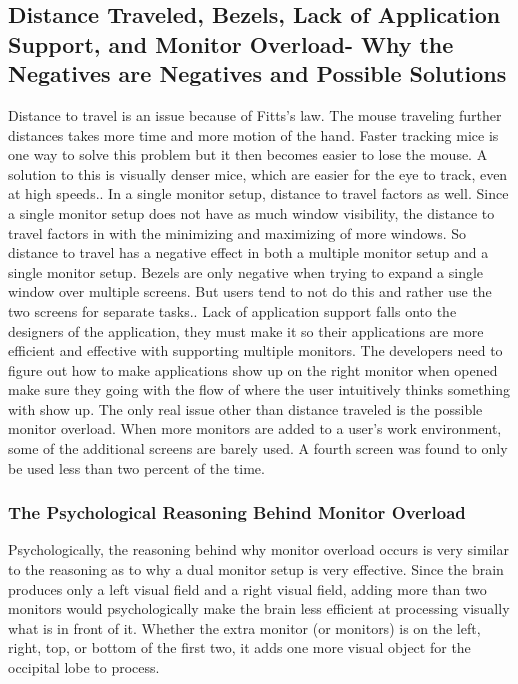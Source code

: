 \documentclass[a4paper]{article}
\begin{document}
\subsection{Distance Traveled, Bezels, Lack of Application Support, and Monitor Overload- Why the Negatives are Negatives and Possible Solutions}
Distance to travel is an issue because of Fitts's law. The mouse traveling further distances takes more time and more motion of the hand. Faster tracking mice is one way to solve this problem but it then becomes easier to lose the mouse. A solution to this is visually denser mice, which are easier for the eye to track, even at high speeds.\cite{Truemper}. In a single monitor setup, distance to travel factors as well. Since a single monitor setup does not have as much window visibility, the distance to travel factors in with the minimizing and maximizing of more windows. So distance to travel has a negative effect in both a multiple monitor setup and a single monitor setup. Bezels are only negative when trying to expand a single window over multiple screens. But users tend to not do this and rather use the two screens for separate tasks.\cite{Grudin}. Lack of application support falls onto the designers of the application, they must make it so their applications are more efficient and effective with supporting multiple monitors. The developers need to figure out how to make applications show up on the right monitor when opened make sure they going with the flow of where the user intuitively thinks something with show up.\cite{Grudin} The only real issue other than distance traveled is the possible monitor overload. When more monitors are added to a user's work environment, some of the additional screens are barely used. A fourth screen was found to only be used less than two percent of the time.\cite{Truemper}
\subsubsection{The Psychological Reasoning Behind Monitor Overload}
Psychologically, the reasoning behind why monitor overload occurs is very similar to the reasoning as to why a dual monitor setup is very effective. Since the brain produces only a left visual field and a right visual field, adding more than two monitors would psychologically make the brain less efficient at processing visually what is in front of it. Whether the extra monitor (or monitors) is on the left, right, top, or bottom of the first two, it adds one more visual object for the occipital lobe to process.
\end{document}
